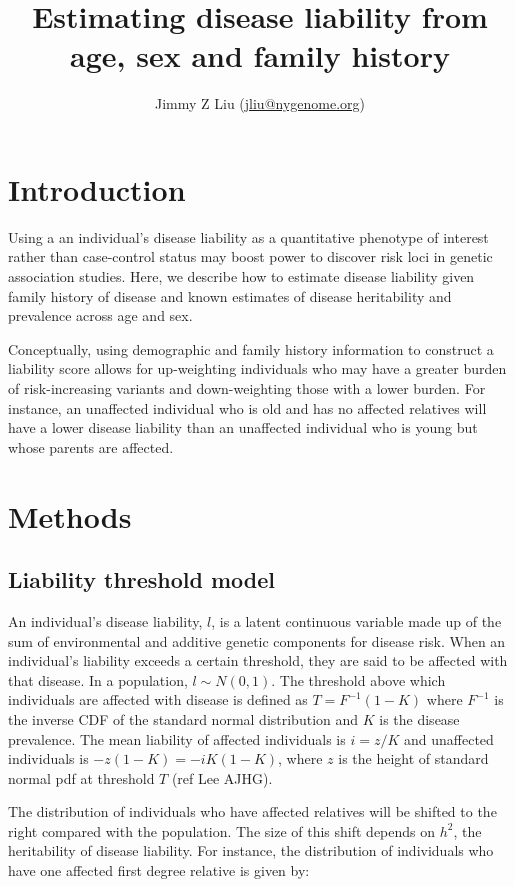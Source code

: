 \documentclass{article}
\begin{document}
\title{Estimating disease liability from age, sex and family history}

\author{Jimmy Z Liu (\url{jliu@nygenome.org})}
\maketitle

\section{Introduction}
Using a an individual's disease liability as a quantitative phenotype of interest rather than case-control status may boost power to discover risk loci in genetic association studies. Here, we describe how to estimate disease liability given family history of disease and known estimates of disease heritability and prevalence across age and sex.

Conceptually, using demographic and family history information to construct a liability score allows for up-weighting individuals who may have a greater burden of risk-increasing variants and down-weighting those with a lower burden. For instance, an unaffected individual who is old and has no affected relatives will have a lower disease liability than an unaffected individual who is young but whose parents are affected.

\section{Methods}
\subsection{Liability threshold model}
An individual's disease liability, $l$, is a latent continuous variable made up of the sum of environmental and additive genetic components for disease risk. When an individual's liability exceeds a certain threshold, they are said to be affected with that disease. In a population, $l \sim N(0,1)$. The threshold above which individuals are affected with disease is defined as $T = F^{-1}(1-K)$ where $F^{-1}$ is the inverse CDF of the standard normal distribution and $K$ is the disease prevalence. The mean liability of affected individuals is $i = z/K$ and unaffected individuals is $-z(1-K) = -iK(1-K)$, where $z$ is the height of standard normal pdf at threshold $T$ (ref Lee AJHG).

The distribution of individuals who have affected relatives will be shifted to the right compared with the population. The size of this shift depends on $h^2$, the heritability of disease liability. For instance, the distribution of individuals who have one affected first degree relative is given by:
\end{document}
